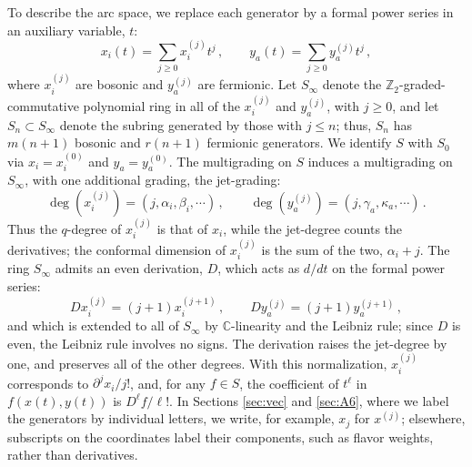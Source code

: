 \documentclass[12pt]{article}
\numberwithin{equation}{section}
\numberwithin{figure}{section}
\theoremstyle{plain}
\theoremstyle{definition}
\begin{document}
To describe the arc space, we replace each generator by a formal power series in an auxiliary variable, $t$:
\begin{equation}
    x_i(t) = \sum_{j \geq 0} x_i^{(j)} t^j \,, \qquad y_a(t) = \sum_{j \geq 0} y_a^{(j)} t^j \,,
\end{equation}
where $x_i^{(j)}$ are bosonic and $y_a^{(j)}$ are fermionic. Let $S_\infty$ denote the $\mathbb{Z}_2$-graded-commutative polynomial ring in all of the $x_i^{(j)}$ and $y_a^{(j)}$, with $j \geq 0$, and let $S_n \subset S_\infty$ denote the subring generated by those with $j \leq n$; thus, $S_n$ has $m(n+1)$ bosonic and $r(n+1)$ fermionic generators. We identify $S$ with $S_0$ via $x_i = x_i^{(0)}$ and $y_a = y_a^{(0)}$. The multigrading on $S$ induces a multigrading on $S_\infty$, with one additional grading, the jet-grading:
\begin{equation}
    \operatorname{deg}(x_i^{(j)}) = (j, \alpha_i, \beta_i, \cdots) \,, \qquad \operatorname{deg}(y_a^{(j)}) = (j, \gamma_a, \kappa_a, \cdots) \,.
\end{equation}
Thus the $q$-degree of $x_i^{(j)}$ is that of $x_i$, while the jet-degree counts the derivatives; the conformal dimension of $x_i^{(j)}$ is the sum of the two, $\alpha_i + j$. The ring $S_\infty$ admits an even derivation, $D$, which acts as $d/dt$ on the formal power series:
\begin{equation}\label{eqn:derivationDef}
    D x_i^{(j)} = (j+1) x_i^{(j+1)} \,, \qquad D y_a^{(j)} = (j+1) y_a^{(j+1)} \,,
\end{equation}
and which is extended to all of $S_\infty$ by $\mathbb{C}$-linearity and the Leibniz rule; since $D$ is even, the Leibniz rule involves no signs. The derivation raises the jet-degree by one, and preserves all of the other degrees. With this normalization, $x_i^{(j)}$ corresponds to $\partial^j x_i / j!$, and, for any $f \in S$, the coefficient of $t^\ell$ in $f(x(t), y(t))$ is $D^\ell f / \ell!$. In Sections \ref{sec:vec} and \ref{sec:A6}, where we label the generators by individual letters, we write, for example, $x_j$ for $x^{(j)}$; elsewhere, subscripts on the coordinates label their components, such as flavor weights, rather than derivatives.
\end{document}
